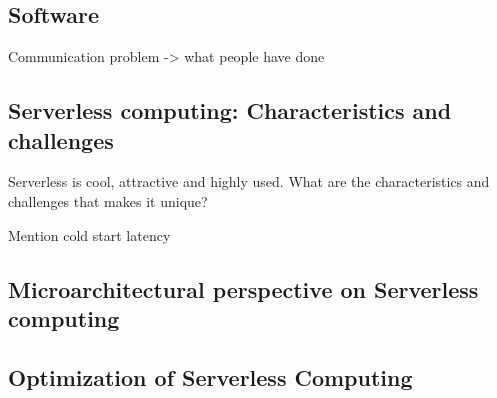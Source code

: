 \documentclass[../main.tex]{subfiles}
\begin{document}
\begin{refsection}
\section{Software}

Communication problem -> what people have done

\subsection{Serverless computing: Characteristics and challenges}
\label{sec:serverless}
Serverless is cool, attractive and highly used. What are the characteristics and challenges that makes it unique?

Mention cold start latency

\subsection{Microarchitectural perspective on Serverless computing}


\subsection{Optimization of Serverless Computing}

\ifx\chapincluded\undefined
  \printbibliography
  \end{refsection}
 \fi
\end{document}

